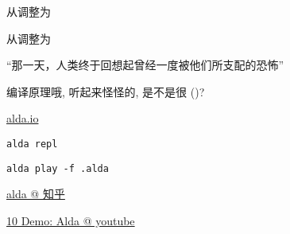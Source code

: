 
\begin{frame}{}
  \begin{center}
    从调整为

    \vspace{0.30cm}
    \vspace{0.30cm}

    从调整为
  \end{center}
\end{frame}

\begin{frame}{}
  \begin{center}

    \vspace{0.50cm}
    ``那一天，人类终于回想起曾经一度被他们所支配的恐怖''
  \end{center}
\end{frame}

\begin{frame}{}
  \begin{center}

    \vspace{0.50cm}
    {编译原理哦, 听起来怪怪的, 是不是很 ()?}
  \end{center}
\end{frame}

\begin{frame}{}
  \begin{center}
    \href{https://alda.io/}{alda.io}


    \texttt{alda repl}

    \vspace{0.20cm}
    \texttt{alda play -f .alda}
  \end{center}
\end{frame}

\begin{frame}{}
  \begin{center}
    \href{https://www.zhihu.com/zvideo/1467997225217908736}{alda @ 知乎}


    \href{https://youtu.be/c5pCFtwO4j8}{10 Demo: Alda @ youtube}
  \end{center}
\end{frame}

